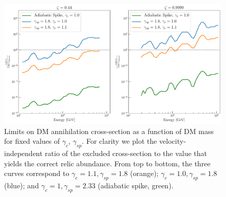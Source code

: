 \begin{figure}[ht] 
\begin{center}
\includegraphics[width=0.9\columnwidth]{figures/final_fixed_astro.pdf}
\noindent
\caption{ 
\label{fig:near-final}
Limits on DM annihilation cross-section as a function of DM mass for fixed values of $\gamma_c$, $\gamma_{sp}$.   For clarity we plot the velocity-independent ratio of the excluded cross-section to the value that yields the correct relic abundance.  From top to bottom, the three curves correspond to  $\gamma_c = 1.1, \gamma_{sp}=1.8$ (orange);  $\gamma_c = 1.0, \gamma_{sp}=1.8$ (blue); and $\gamma_c = 1, \gamma_{sp}=2.33$ (adiabatic spike, green).
}
\end{center}
\end{figure}
